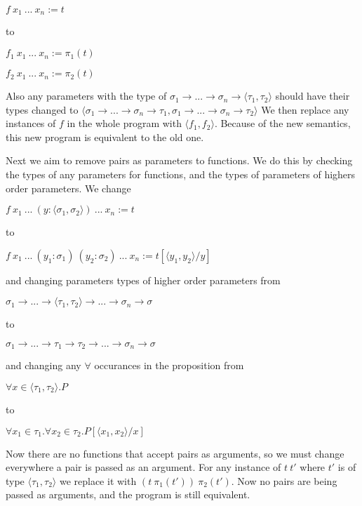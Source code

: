 \documentclass[12pt,a4paper,titlepage]{article}
\begin{document}
    $f\ x_1\ ...\ x_n := t$

    to

    $f_1\ x_1\ ...\ x_n := \pi_1(t)$

    $f_2\ x_1\ ...\ x_n := \pi_2(t)$

    Also any parameters with the type of
    $\sigma_1 \rightarrow ... \rightarrow \sigma_n \rightarrow \langle \tau_1, \tau_2 \rangle$
    should have their types changed to
    $\langle \sigma_1 \rightarrow ... \rightarrow \sigma_n \rightarrow \tau_1, \sigma_1 \rightarrow ... \rightarrow \sigma_n \rightarrow \tau_2 \rangle$
    We then replace any instances of $f$ in the whole program with $\langle f_1, f_2 \rangle$.
    Because of the new semantics, this new program is equivalent to the old one.

    Next we aim to remove pairs as parameters to functions. We do this by checking the types of any parameters
    for functions, and the types of parameters of highers order parameters. We change

    $f\ x_1\ ...\ (y: \langle \sigma_1, \sigma_2 \rangle)\ ...\ x_n := t$

    to

    $f\ x_1\ ...\ (y_1: \sigma_1)\ (y_2: \sigma_2)\ ...\ x_n := t[\langle y_1, y_2 \rangle / y]$

    and changing parameters types of higher order parameters from

    $\sigma_1 \rightarrow ... \rightarrow \langle \tau_1, \tau_2 \rangle \rightarrow ... \rightarrow \sigma_n \rightarrow \sigma$

    to

    $\sigma_1 \rightarrow ... \rightarrow \tau_1 \rightarrow \tau_2 \rightarrow ... \rightarrow \sigma_n \rightarrow \sigma$

    and changing any $\forall$ occurances in the proposition from

    $\forall x \in \langle \tau_1, \tau_2 \rangle . P$

    to

    $\forall x_1 \in \tau_1 . \forall x_2 \in \tau_2 . P[\langle x_1, x_2 \rangle / x]$

    Now there are no functions that accept pairs as arguments, so we must change everywhere a pair is passed as
    an argument.
    For any instance of $t\ t'$ where $t'$ is of type $\langle \tau_1, \tau_2 \rangle$ we replace it with
    $(t\ \pi_1(t'))\ \pi_2(t')$.
    Now no pairs are being passed as arguments, and the program is still equivalent.
\end{document}
